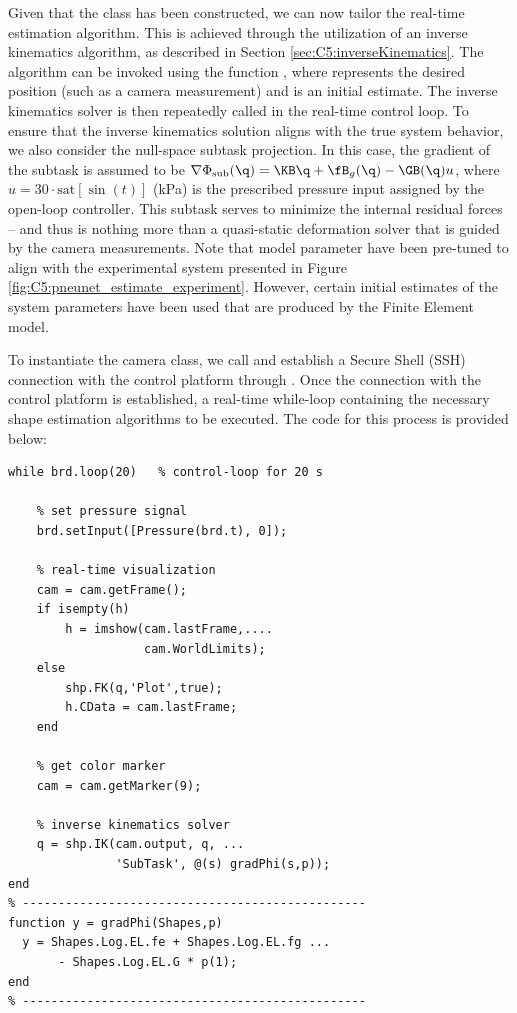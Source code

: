 Given that the  class has been constructed, we can now tailor the real-time estimation algorithm. This is achieved through the utilization of an inverse kinematics algorithm, as described in Section \ref{sec:C5:inverseKinematics}. The algorithm can be invoked using the function , where  represents the desired position (such as a camera measurement) and  is an initial estimate. The inverse kinematics solver is then repeatedly called in the real-time control loop. To ensure that the inverse kinematics solution aligns with the true system behavior, we also consider the null-space subtask projection. In this case, the gradient of the subtask is assumed to be $\nabla \Phi_{\textrm{sub}}(\q) = \KB \q + \fB_g(\q) - \GB(\q) u$, where $u = 30 \cdot \textrm{sat}\left[ \sin(t) \right]$ (\si{\kilo \pascal}) is the prescribed pressure input assigned by the open-loop controller. This subtask serves to minimize the internal residual forces -- and thus is nothing more than a quasi-static deformation solver that is guided by the camera measurements. Note that model parameter have been pre-tuned to align with the experimental system presented in Figure \ref{fig:C5:pneunet_estimate_experiment}. However, certain initial estimates of the system parameters have been used that are produced by the Finite Element model.

\par To instantiate the camera class, we call  and establish a Secure Shell (SSH) connection with the control platform through . Once the connection with the control platform is established, a real-time while-loop containing the necessary shape estimation algorithms to be executed. The code for this process is provided below:

\begin{lstlisting}[style=matlab] 
while brd.loop(20)   % control-loop for 20 s

    % set pressure signal
    brd.setInput([Pressure(brd.t), 0]);
    
    % real-time visualization
    cam = cam.getFrame();
    if isempty(h)
        h = imshow(cam.lastFrame,.... 
                   cam.WorldLimits); 
    else
        shp.FK(q,'Plot',true);
        h.CData = cam.lastFrame;
    end

    % get color marker
    cam = cam.getMarker(9);

    % inverse kinematics solver
    q = shp.IK(cam.output, q, ... 
               'SubTask', @(s) gradPhi(s,p));               
end
% ------------------------------------------------
function y = gradPhi(Shapes,p)
  y = Shapes.Log.EL.fe + Shapes.Log.EL.fg ... 
       - Shapes.Log.EL.G * p(1);
end
% ------------------------------------------------
\end{lstlisting}

